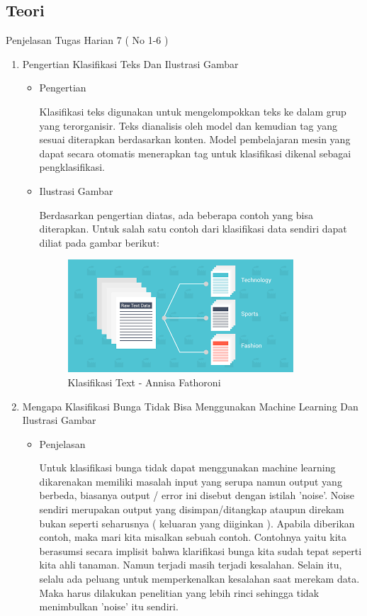\subsection{Teori}
Penjelasan Tugas Harian 7 ( No 1-6 )
\begin{enumerate}
\item Pengertian Klasifikasi Teks Dan Ilustrasi Gambar
\begin{itemize}
\item Pengertian

Klasifikasi teks digunakan untuk mengelompokkan teks ke dalam grup yang terorganisir. Teks dianalisis oleh model dan kemudian tag yang sesuai diterapkan berdasarkan konten. Model pembelajaran mesin yang dapat secara otomatis menerapkan tag untuk klasifikasi dikenal sebagai pengklasifikasi.

\item Ilustrasi Gambar

Berdasarkan pengertian diatas, ada beberapa contoh yang bisa diterapkan. Untuk salah satu contoh dari klasifikasi data sendiri dapat diliat pada gambar berikut:

\begin{figure}[!hbtp]
\centering
\includegraphics[scale=0.8]{figures/Chapter4AnnisaFathoroni1.png}
\caption{Klasifikasi Text - Annisa Fathoroni}
\label{Klasifikasi Text - Annisa Fathoroni}
\end{figure}

\end{itemize}

\item Mengapa Klasifikasi Bunga Tidak Bisa Menggunakan Machine Learning Dan Ilustrasi Gambar
\begin{itemize}
\item  Penjelasan

Untuk klasifikasi bunga tidak dapat menggunakan machine learning dikarenakan memiliki masalah input yang serupa namun output yang berbeda, biasanya output / error ini disebut dengan istilah 'noise'. Noise sendiri merupakan output yang disimpan/ditangkap ataupun direkam bukan seperti seharusnya ( keluaran yang diiginkan ). Apabila diberikan contoh, maka mari kita misalkan sebuah contoh. Contohnya yaitu kita berasumsi secara implisit bahwa klarifikasi bunga kita sudah tepat seperti kita ahli tanaman. Namun terjadi masih terjadi kesalahan. Selain itu, selalu ada peluang untuk memperkenalkan kesalahan saat merekam data. Maka harus dilakukan penelitian yang lebih rinci sehingga tidak menimbulkan 'noise' itu sendiri.


\end{itemize}
\end{enumerate}
